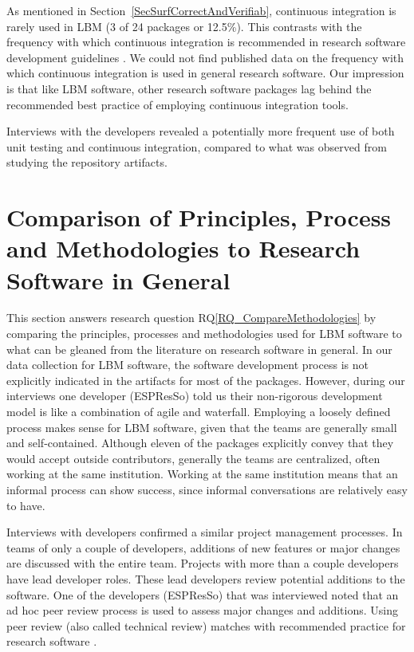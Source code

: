 \documentclass[runningheads]{llncs}
\newcommand{\rqref}[1]{RQ\ref{#1}}
\begin{document}
As mentioned in Section~\ref{SecSurfCorrectAndVerifiab}, continuous integration
is rarely used in LBM (3 of 24 packages or 12.5\%). This contrasts with the
frequency with which continuous integration is recommended in research software
development guidelines \cite{BrettEtAl2021,Brown2015,ThielEtAl2020,Zadka2018,vanGompelEtAl2016}.  We could not find published data on the
frequency with which continuous integration is used in general research
software.  Our impression is that like LBM software, other research software
packages lag behind the recommended best practice of employing continuous
integration tools.

Interviews with the developers revealed a potentially more frequent use of both
unit testing and continuous integration, compared to what was observed from
studying the repository artifacts.

\section{Comparison of Principles, Process and Methodologies to Research Software in General} \label{Sec_CompareMethodologies}

This section answers research question \rqref{RQ_CompareMethodologies} by
comparing the principles, processes and methodologies used for LBM software to
what can be gleaned from the literature on research software in general. In our
data collection for LBM software, the software development process is not
explicitly indicated in the artifacts for most of the packages. However, during
our interviews one developer (ESPResSo) told us their non-rigorous development
model is like a combination of agile and waterfall. Employing a loosely defined
process makes sense for LBM software, given that the teams are generally small
and self-contained.  Although eleven of the packages explicitly convey that they
would accept outside contributors, generally the teams are centralized, often
working at the same institution.  Working at the same institution means that an
informal process can show success, since informal conversations are relatively
easy to have.

Interviews with developers confirmed a similar project management processes. In
teams of only a couple of developers, additions of new features or major changes
are discussed with the entire team. Projects with more than a couple developers
have lead developer roles. These lead developers review potential additions to
the software. One of the developers (ESPResSo) that was interviewed noted that
an ad hoc peer review process is used to assess major changes and additions.
Using peer review (also called technical review) matches with recommended
practice for research software \cite{HerouxEtAl2008,Givler2020,OrvizEtAl2017,USGS2019}.
\end{document}
